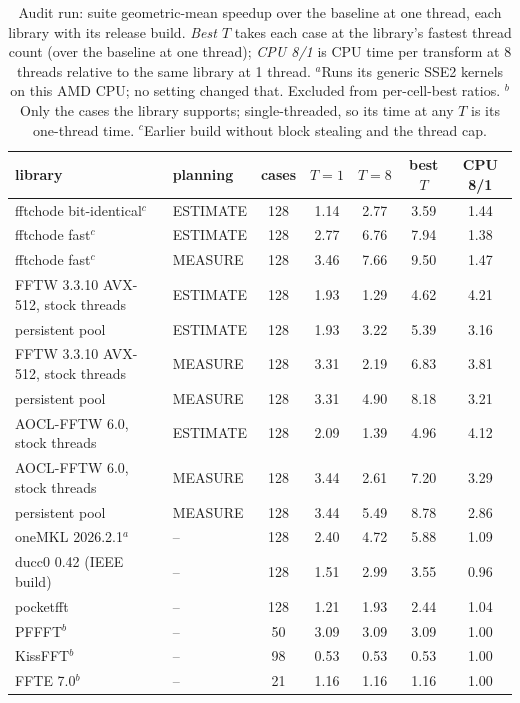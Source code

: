 \documentclass[10pt]{article}
\theoremstyle{definition}
\begin{document}
\begin{table}[t]
\centering\small
\begin{tabular}{llccccc}
\toprule
library & planning & cases & $T=1$ & $T=8$ & best $T$ & CPU 8/1\\
\midrule
fftchode bit-identical$^c$ & ESTIMATE & 128 & 1.14 & 2.77 & 3.59 & 1.44\\
fftchode fast$^c$ & ESTIMATE & 128 & 2.77 & 6.76 & 7.94 & 1.38\\
fftchode fast$^c$ & MEASURE & 128 & 3.46 & 7.66 & 9.50 & 1.47\\
FFTW 3.3.10 AVX-512, stock threads & ESTIMATE & 128 & 1.93 & 1.29 & 4.62 & 4.21\\
\quad persistent pool & ESTIMATE & 128 & 1.93 & 3.22 & 5.39 & 3.16\\
FFTW 3.3.10 AVX-512, stock threads & MEASURE & 128 & 3.31 & 2.19 & 6.83 & 3.81\\
\quad persistent pool & MEASURE & 128 & 3.31 & 4.90 & 8.18 & 3.21\\
AOCL-FFTW 6.0, stock threads & ESTIMATE & 128 & 2.09 & 1.39 & 4.96 & 4.12\\
AOCL-FFTW 6.0, stock threads & MEASURE & 128 & 3.44 & 2.61 & 7.20 & 3.29\\
\quad persistent pool & MEASURE & 128 & 3.44 & 5.49 & 8.78 & 2.86\\
oneMKL 2026.2.1$^a$ & -- & 128 & 2.40 & 4.72 & 5.88 & 1.09\\
ducc0 0.42 (IEEE build) & -- & 128 & 1.51 & 2.99 & 3.55 & 0.96\\
pocketfft & -- & 128 & 1.21 & 1.93 & 2.44 & 1.04\\
PFFFT$^b$ & -- & 50 & 3.09 & 3.09 & 3.09 & 1.00\\
KissFFT$^b$ & -- & 98 & 0.53 & 0.53 & 0.53 & 1.00\\
FFTE 7.0$^b$ & -- & 21 & 1.16 & 1.16 & 1.16 & 1.00\\
\bottomrule
\end{tabular}
\caption{Audit run: suite geometric-mean speedup over the baseline at one thread, each library with its release build. \emph{Best $T$} takes each case at the library's fastest thread count (over the baseline at one thread); \emph{CPU 8/1} is CPU time per transform at 8 threads relative to the same library at 1 thread. $^a$Runs its generic SSE2 kernels on this AMD CPU; no setting changed that. Excluded from per-cell-best ratios. $^b$Only the cases the library supports; single-threaded, so its time at any $T$ is its one-thread time. $^c$Earlier build without block stealing and the thread cap.}\label{tab:cmp}
\end{table}
\end{document}
